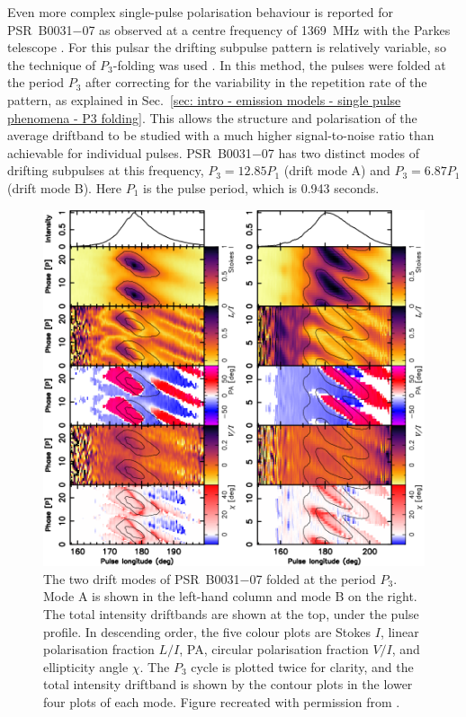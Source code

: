 Even more complex single-pulse polarisation behaviour is reported for PSR~B0031$-$07 as observed at a centre frequency of 1369~MHz with the Parkes telescope \citep{IWJ+2020}. For this pulsar the drifting subpulse pattern is relatively variable, so the technique of $P_3$-folding was used \citep{HSW+2013,Wxxx2016}. In this method, the pulses were folded at the period $P_3$ after correcting for the variability in the repetition rate of the pattern, as explained in Sec.~\ref{sec: intro - emission models - single pulse phenomena - P3 folding}. This allows the structure and polarisation of the average driftband to be studied with a much higher signal-to-noise ratio than achievable for individual pulses. PSR~B0031$-$07 has two distinct modes of drifting subpulses at this frequency, $P_3 = 12.85 P_1$ (drift mode A) and $P_3 = 6.87 P_1$ (drift mode B). Here $P_1$ is the pulse period, which is 0.943 seconds.

\begin{figure}
    \begin{center}
        \includegraphics[width=1.0\textwidth]{Figures/B0031/observed_P3folds}
        \caption[The two P3-folded drift modes of PSR~B0031$-$07]{The two drift modes of PSR~B0031$-$07 folded at the period $P_3$. Mode A is shown in the left-hand column and mode B on the right. The total intensity driftbands are shown at the top, under the pulse profile. In descending order, the five colour plots are Stokes $I$, linear polarisation fraction $L/I$, PA, circular polarisation fraction $V/I$, and ellipticity angle $\chi$. The $P_3$ cycle is plotted twice for clarity, and the total intensity driftband is shown by the contour plots in the lower four plots of each mode. Figure recreated with permission from \citet{IWJ+2020}.}
        \label{fig: B0031 - observed P3folds}
    \end{center}
\end{figure}

